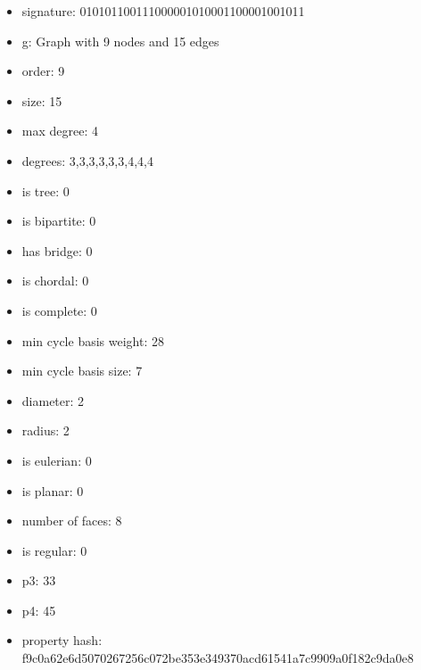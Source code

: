 \begin{figure}
\end{figure}
\begin{itemize}
\item signature: 010101100111000001010001100001001011
\item g: Graph with 9 nodes and 15 edges
\item order: 9
\item size: 15
\item max degree: 4
\item degrees: 3,3,3,3,3,3,4,4,4
\item is tree: 0
\item is bipartite: 0
\item has bridge: 0
\item is chordal: 0
\item is complete: 0
\item min cycle basis weight: 28
\item min cycle basis size: 7
\item diameter: 2
\item radius: 2
\item is eulerian: 0
\item is planar: 0
\item number of faces: 8
\item is regular: 0
\item p3: 33
\item p4: 45
\item property hash: f9c0a62e6d5070267256c072be353e349370acd61541a7c9909a0f182c9da0e8
\end{itemize}
\newpage
